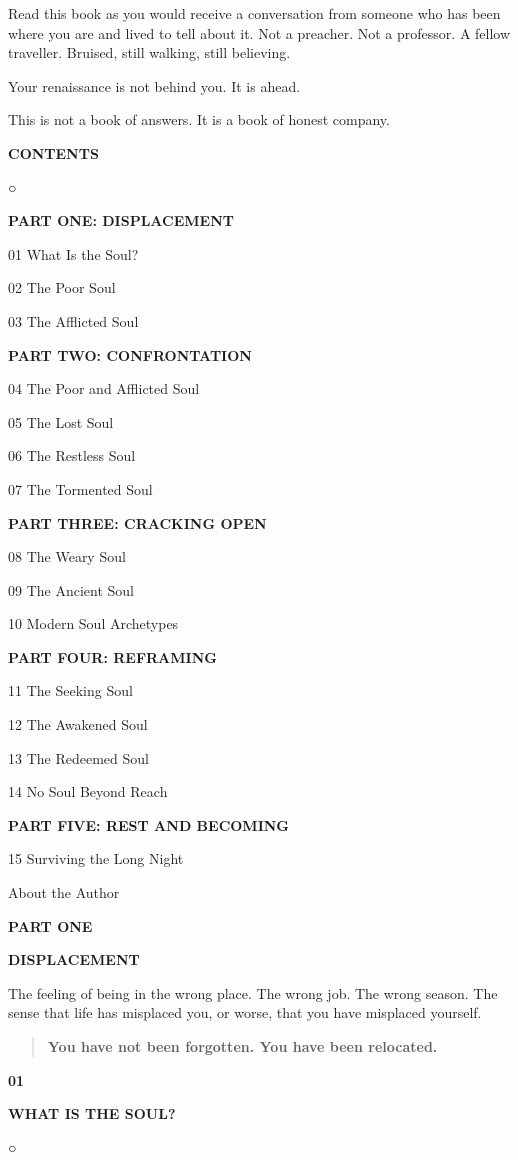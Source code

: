 Read this book as you would receive a conversation from someone who has
been where you are and lived to tell about it. Not a preacher. Not a
professor. A fellow traveller. Bruised, still walking, still believing.

Your renaissance is not behind you. It is ahead.

This is not a book of answers. It is a book of honest company.

\textbf{CONTENTS}

○

\textbf{PART ONE: DISPLACEMENT}

01 What Is the Soul?

02 The Poor Soul

03 The Afflicted Soul

\textbf{PART TWO: CONFRONTATION}

04 The Poor and Afflicted Soul

05 The Lost Soul

06 The Restless Soul

07 The Tormented Soul

\textbf{PART THREE: CRACKING OPEN}

08 The Weary Soul

09 The Ancient Soul

10 Modern Soul Archetypes

\textbf{PART FOUR: REFRAMING}

11 The Seeking Soul

12 The Awakened Soul

13 The Redeemed Soul

14 No Soul Beyond Reach

\textbf{PART FIVE: REST AND BECOMING}

15 Surviving the Long Night

About the Author

\textbf{PART ONE}

\textbf{DISPLACEMENT}

The feeling of being in the wrong place. The wrong job. The wrong
season. The sense that life has misplaced you, or worse, that you have
misplaced yourself.

\begin{quote}
\textbf{You have not been forgotten. You have been relocated.}
\end{quote}

\textbf{01}

\textbf{WHAT IS THE SOUL?}

○

